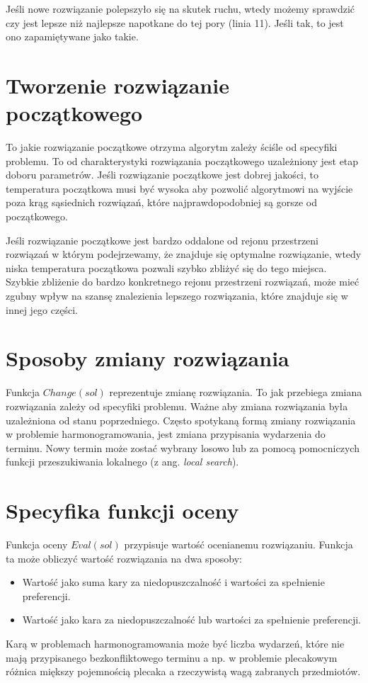 Jeśli nowe rozwiązanie polepszyło się na skutek ruchu, wtedy możemy sprawdzić
czy jest lepsze niż najlepsze napotkane do tej pory (linia 11). Jeśli tak, to
jest ono zapamiętywane jako takie.

\section{Tworzenie rozwiązanie początkowego}
To jakie rozwiązanie początkowe otrzyma algorytm zależy ściśle od specyfiki
problemu. To od charakterystyki rozwiązania początkowego uzależniony jest etap
doboru parametrów. Jeśli rozwiązanie początkowe jest dobrej jakości, to
temperatura początkowa musi być wysoka aby pozwolić algorytmowi na wyjście poza
krąg sąsiednich rozwiązań, które najprawdopodobniej są gorsze od początkowego.

Jeśli rozwiązanie początkowe jest bardzo oddalone od rejonu przestrzeni
rozwiązań w którym podejrzewamy, że znajduje się optymalne rozwiązanie, wtedy
niska temperatura początkowa pozwali szybko zbliżyć się do tego miejsca. Szybkie
zbliżenie do bardzo konkretnego rejonu przestrzeni rozwiązań, może mieć zgubny
wpływ na szansę znalezienia lepszego rozwiązania, które znajduje się w innej
jego części.

\section{Sposoby zmiany rozwiązania}
Funkcja $Change(sol)$ reprezentuje zmianę rozwiązania. To jak przebiega zmiana
rozwiązania zależy od specyfiki problemu. Ważne aby zmiana rozwiązania była uzależniona
od stanu poprzedniego.
Często spotykaną formą zmiany rozwiązania w problemie harmonogramowania, jest
zmiana przypisania wydarzenia do terminu. Nowy termin może zostać wybrany losowo
lub za pomocą pomocniczych funkcji przeszukiwania lokalnego (z ang.
\emph{local search}).
\pagebreak
\section{Specyfika funkcji oceny}
Funkcja oceny $Eval(sol)$ przypisuje wartość ocenianemu rozwiązaniu. Funkcja ta
może obliczyć wartość rozwiązania na dwa sposoby:
\begin{itemize}
	\item Wartość jako suma kary za niedopuszczalność i wartości za
		spełnienie preferencji.
	\item Wartość jako kara za niedopuszczalność lub wartości za
		spełnienie preferencji.
\end{itemize}
Karą w problemach harmonogramowania może być liczba wydarzeń, które nie mają
przypisanego bezkonfliktowego terminu a np. w problemie plecakowym różnica miększy
pojemnością plecaka a rzeczywistą wagą zabranych przedmiotów.

